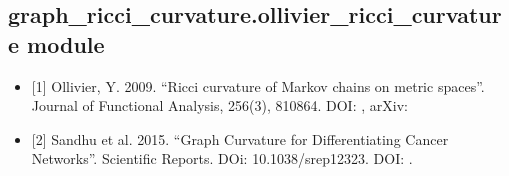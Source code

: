 \documentclass[letterpaper,10pt,english]{sphinxmanual}
\begin{document}
\subsection{graph\_ricci\_curvature.ollivier\_ricci\_curvature module}
\label{\detokenize{graph_ricci_curvature:module-graph_ricci_curvature.ollivier_ricci_curvature}}\label{\detokenize{graph_ricci_curvature:graph-ricci-curvature-ollivier-ricci-curvature-module}}\begin{description}
\begin{itemize}
\item {} 
\sphinxAtStartPar
{[}1{]} Ollivier, Y. 2009. “Ricci curvature of Markov chains on metric spaces”. Journal of Functional Analysis, 256(3), 810\sphinxhyphen{}864. DOI: , arXiv: 

\item {} 
\sphinxAtStartPar
{[}2{]} Sandhu et al. 2015. “Graph Curvature for Differentiating Cancer Networks”. Scientific Reports. DOi: 10.1038/srep12323. DOI: .

\end{itemize}

\end{description}
\end{document}
